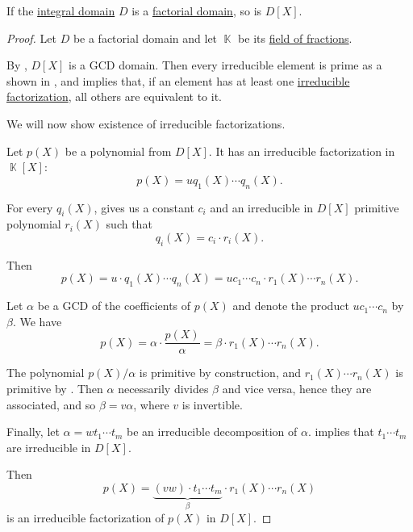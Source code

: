 \begin{proposition}\label{thm:polynomial_ring_over_factorial}
  If the \hyperref[def:integral_domain]{integral domain} \( D \) is a \hyperref[def:factorial_domain]{factorial domain}, so is \( D[X] \).
\end{proposition}
\begin{proof}
  Let \( D \) be a factorial domain and let \( \BbbK \) be its \hyperref[def:field_of_fractions]{field of fractions}.

  By , \( D[X] \) is a GCD domain. Then every irreducible element is prime as a shown in , and  implies that, if an element has at least one \hyperref[def:irreducible_factorization]{irreducible factorization}, all others are equivalent to it.

  We will now show existence of irreducible factorizations.

  Let \( p(X) \) be a polynomial from \( D[X] \). It has an irreducible factorization in \( \BbbK[X] \):
  \begin{equation*}
    p(X) = u q_1(X) \cdots q_n(X).
  \end{equation*}

  For every \( q_i(X) \),  gives us a constant \( c_i \) and an irreducible in \( D[X] \) primitive polynomial \( r_i(X) \) such that
  \begin{equation*}
    q_i(X) = c_i \cdot r_i(X).
  \end{equation*}

  Then
  \begin{equation*}
    p(X)
    =
    u \cdot q_1(X) \cdots q_n(X)
    =
    u c_1 \cdots c_n \cdot r_1(X) \cdots r_n(X).
  \end{equation*}

  Let \( \alpha \) be a GCD of the coefficients of \( p(X) \) and denote the product \( u c_1 \cdots c_n \) by \( \beta \). We have
  \begin{equation*}
    p(X) = \alpha \cdot \frac {p(X)} \alpha = \beta \cdot r_1(X) \cdots r_n(X).
  \end{equation*}

  The polynomial \( p(X) / \alpha \) is primitive by construction, and \( r_1(X) \cdots r_n(X) \) is primitive by . Then \( \alpha \) necessarily divides \( \beta \) and vice versa, hence they are associated, and so \( \beta = v \alpha \), where \( v \) is invertible.

  Finally, let \( \alpha = w t_1 \cdots t_m \) be an irreducible decomposition of \( \alpha \).  implies that \( t_1 \cdots t_m \) are irreducible in \( D[X] \).

  Then
  \begin{equation*}
    p(X) = \underbrace{(v w) \cdot t_1 \cdots t_m}_{\beta} \cdot r_1(X) \cdots r_n(X)
  \end{equation*}
  is an irreducible factorization of \( p(X) \) in \( D[X] \).
\end{proof}

